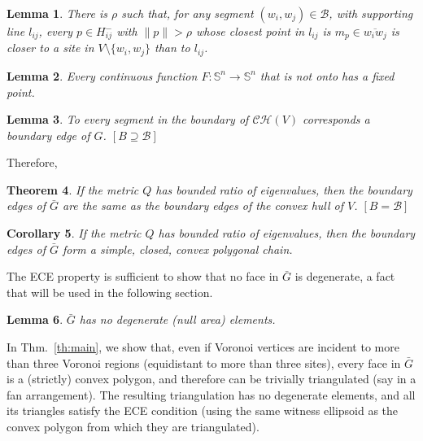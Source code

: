\documentclass[11pt]{article}
\newtheorem{theorem}{Theorem}[section]
\newtheorem{lemma}[theorem]{Lemma}
\newtheorem{corollary}[theorem]{Corollary}
\begin{document}
\begin{lemma}\label{lem:contrad}
	There is $\rho$ such that, for any segment $(w_i,w_j)\in\mathcal{B}$, with supporting line $l_{ij}$, every $p\in H^{-}_{ij}$ with $\|p\| > \rho$
    whose closest point in $l_{ij}$ is $m_p\in\overline{w_i w_j}$ is 
	closer to a site in $V\setminus\{w_i,w_j\}$ than to $l_{ij}$. 
\end{lemma}







\begin{lemma}\label{lem:Sn}
	Every continuous function $F:\mathbb{S}^n\rightarrow\mathbb{S}^n$ that is not onto has a fixed point. 
\end{lemma}




\begin{lemma}\label{lem:hard}
 To every segment  in the boundary of
$\mathcal{CH}(V)$ corresponds a boundary edge of $G$. \emph{$[B\supseteq\mathcal{B}]$}
\end{lemma}

Therefore,

\begin{theorem}\label{thm:boundary}
If the metric $Q$ has bounded ratio of eigenvalues, then the boundary edges of $\bar{G}$ are the same as the boundary edges of the convex hull of $V$.  \emph{$[B=\mathcal{B}]$} 
\end{theorem}

\begin{corollary}\label{col:simple-boundary}
If the metric $Q$ has bounded ratio of eigenvalues, then the boundary edges of $\bar{G}$ form a simple, closed, convex polygonal chain. \end{corollary}


The ECE property is sufficient to show that no face in $\bar{G}$ is degenerate, a fact that will be used in the following section. 

\begin{lemma}\label{lem:degen}
	$\bar{G}$ has no degenerate (null area) elements. 
\end{lemma}




In Thm.~\ref{th:main}, we show that, even if Voronoi vertices are incident to more than three Voronoi regions (equidistant to more than three sites), every face in $\bar{G}$ is a (strictly) convex polygon, and therefore can be trivially triangulated (say in a fan arrangement). 
The resulting triangulation has no degenerate elements, and all its triangles satisfy the ECE condition (using the same witness ellipsoid as the convex polygon from which they are triangulated). 
\end{document}
